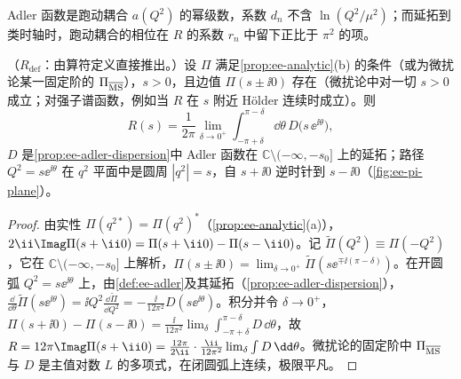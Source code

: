 Adler 函数是跑动耦合 $a(Q^2)$ 的幂级数，系数 $d_n$ 不含 $\ln(Q^2/\mu^2)$；而延拓到类时轴时，跑动耦合的相位在 $R$ 的系数 $r_n$ 中留下正比于 $\pi^2$ 的项。

\begin{proposition}\label{prop:ee-contour}
（$R_{\mathrm{def}}$：由算符定义直接推出。）设 $\Pi$ 满足\cref{prop:ee-analytic}(b) 的条件（或为微扰论某一固定阶的 $\Pi_{\overline{\rm MS}}$），$s>0$，且边值 $\Pi(s\pm\ii0)$ 存在（微扰论中对一切 $s>0$ 成立；对强子谱函数，例如当 $R$ 在 $s$ 附近 Hölder 连续时成立）。则
\begin{equation}\label{eq:ee-contour}
R(s)=\frac1{2\pi}\lim_{\delta\to0^+}\int_{-\pi+\delta}^{\pi-\delta}\!\dd\theta\,D\big(s\,\ee^{\ii\theta}\big),
\end{equation}
$D$ 是\cref{prop:ee-adler-dispersion}中 Adler 函数在 $\mathbb C\setminus(-\infty,-s_0]$ 上的延拓；路径 $Q^2=s\ee^{\ii\theta}$ 在 $q^2$ 平面中是圆周 $|q^2|=s$，自 $s+\ii0$ 逆时针到 $s-\ii0$（\cref{fig:ee-pi-plane}）。
\end{proposition}
\begin{proof}
由实性 $\Pi(q^{2*})=\Pi(q^2)^*$（\cref{prop:ee-analytic}(a)），$2\ii\Imag\Pi(s+\ii0)=\Pi(s+\ii0)-\Pi(s-\ii0)$。记 $\tilde\Pi(Q^2)\equiv\Pi(-Q^2)$，它在 $\mathbb C\setminus(-\infty,-s_0]$ 上解析，$\Pi(s\pm\ii0)=\lim_{\delta\to0^+}\tilde\Pi(s\ee^{\mp\ii(\pi-\delta)})$。在开圆弧 $Q^2=s\ee^{\ii\theta}$ 上，由\cref{def:ee-adler}及其延拓（\cref{prop:ee-adler-dispersion}），$\frac{\dd}{\dd\theta}\tilde\Pi(s\ee^{\ii\theta})=\ii Q^2\frac{\dd\tilde\Pi}{\dd Q^2}=-\frac{\ii}{12\pi^2}D(s\ee^{\ii\theta})$。积分并令 $\delta\to0^+$，$\Pi(s+\ii0)-\Pi(s-\ii0)=\frac{\ii}{12\pi^2}\lim_\delta\int_{-\pi+\delta}^{\pi-\delta}D\,\dd\theta$，故 $R=12\pi\Imag\Pi(s+\ii0)=\frac{12\pi}{2\ii}\cdot\frac{\ii}{12\pi^2}\lim_\delta\int D\,\dd\theta$。微扰论的固定阶中 $\Pi_{\overline{\rm MS}}$ 与 $D$ 是主值对数 $L$ 的多项式，在闭圆弧上连续，极限平凡。
\end{proof}

